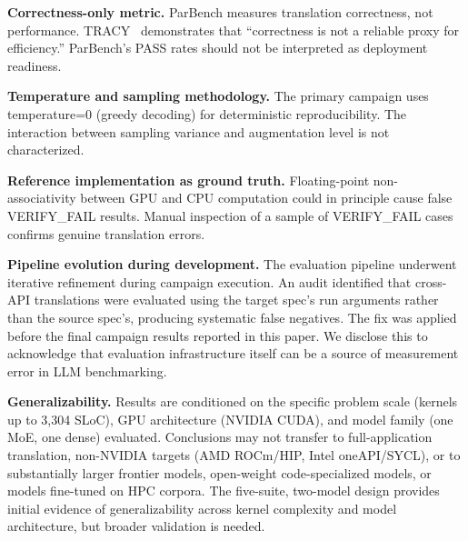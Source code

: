 \documentclass[conference]{IEEEtran}
\newcommand{\verifyfail}{\textsc{VERIFY\_FAIL}}
\begin{document}
\textbf{Correctness-only metric.} ParBench measures translation correctness, not performance. TRACY~\cite{TRACY2025} demonstrates that ``correctness is not a reliable proxy for efficiency.'' ParBench's PASS rates should not be interpreted as deployment readiness.

\textbf{Temperature and sampling methodology.} The primary campaign uses temperature=0 (greedy decoding) for deterministic reproducibility. The interaction between sampling variance and augmentation level is not characterized.

\textbf{Reference implementation as ground truth.} Floating-point non-associativity between GPU and CPU computation could in principle cause false \verifyfail{} results. Manual inspection of a sample of \verifyfail{}{} cases confirms genuine translation errors.

\textbf{Pipeline evolution during development.} The evaluation pipeline underwent iterative refinement during campaign execution. An audit identified that cross-API translations were evaluated using the target spec's run arguments rather than the source spec's, producing systematic false negatives. The fix was applied before the final campaign results reported in this paper. We disclose this to acknowledge that evaluation infrastructure itself can be a source of measurement error in LLM benchmarking.

\textbf{Generalizability.} Results are conditioned on the specific problem scale (kernels up to 3,304 SLoC), GPU architecture (NVIDIA CUDA), and model family (one MoE, one dense) evaluated. Conclusions may not transfer to full-application translation, non-NVIDIA targets (AMD ROCm/HIP, Intel oneAPI/SYCL), or to substantially larger frontier models, open-weight code-specialized models, or models fine-tuned on HPC corpora. The five-suite, two-model design provides initial evidence of generalizability across kernel complexity and model architecture, but broader validation is needed.

\end{document}
